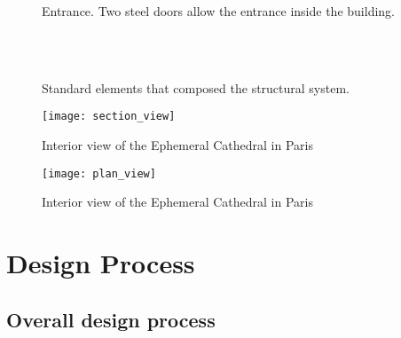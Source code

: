 \begin{figure}[p]
	\captionsetup[subfloat]{captionskip=10pt}
     	\centering
	\begin{fullpage}	
		\hspace*{\fill}
		\vspace{10pt}
		\caption{Entrance. Two steel doors allow the entrance inside the building.}
		\label{fig:door}
     		\vspace{1cm}
		\hspace*{\fill}
		 \\
		\hspace*{\fill}
		 \\
		\vspace{10pt}
		\caption{Standard elements that composed the structural system.}
		\label{fig:parts}    
	\end{fullpage}
\end{figure}




\begin{figure}[p]
	\captionsetup[subfloat]{captionskip=20pt}
     	\centering
	\begin{fullpage}	
		\texttt{[image: section\_view]}
		\caption{Interior view of the Ephemeral Cathedral in Paris}
		\label{fig:sec}
		\vspace{1.5cm}
		\texttt{[image: plan\_view]}
		\caption{Interior view of the Ephemeral Cathedral in Paris}
		\label{fig:plan_view}	
	\end{fullpage}
\end{figure}

\clearpage


\section{Design Process}

\subsection{Overall design process}

